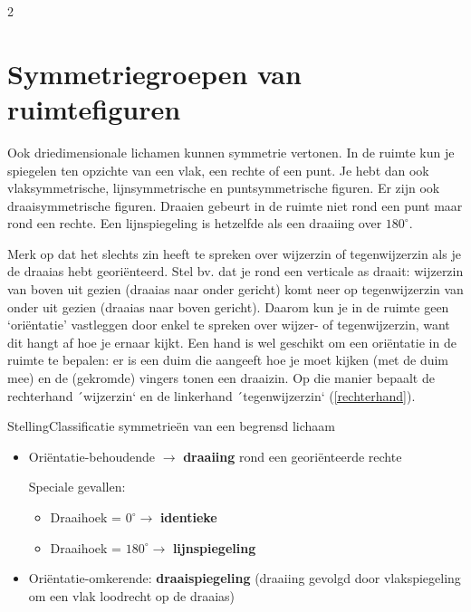 \begin{multicols}{2}
	
\section{Symmetriegroepen van ruimtefiguren}
	
	Ook driedimensionale lichamen kunnen symmetrie vertonen. In de ruimte kun je spiegelen ten opzichte van een vlak, een rechte of een punt. Je hebt dan ook vlaksymmetrische, lijnsymmetrische en puntsymmetrische figuren. Er zijn ook draaisymmetrische figuren. Draaien gebeurt in de ruimte niet rond een punt maar rond een rechte. Een lijnspiegeling is hetzelfde als een draaiing over $180^\circ$. 
 
		Merk op dat het slechts zin heeft te spreken over wijzerzin of tegenwijzerzin als je de draaias hebt georiënteerd. Stel bv. dat je rond een verticale as draait: wijzerzin van boven uit gezien (draaias naar onder gericht) komt neer op tegenwijzerzin van onder uit gezien (draaias naar boven gericht). Daarom kun je in de ruimte geen `oriëntatie' vastleggen door enkel te spreken over wijzer- of tegenwijzerzin, want dit hangt af hoe je ernaar kijkt. Een hand is wel geschikt om een oriëntatie in de ruimte te bepalen: er is een duim die aangeeft hoe je moet kijken (met de duim mee) en de (gekromde) vingers tonen een draaizin. Op die manier bepaalt de rechterhand ´wijzerzin` en de linkerhand ´tegenwijzerzin` (\autoref{rechterhand}).
	
	\begin{kader}{Stelling}{Classificatie symmetrieën van een begrensd lichaam}
	\begin{itemize}
	    \item Oriëntatie-behoudende $\rightarrow$ \textbf{draaiing} rond een georiënteerde rechte
	    
	    Speciale gevallen:
	    \begin{itemize}
	       \item Draaihoek = $0^\circ \rightarrow$ \textbf{identieke}
	       \item Draaihoek = $180^\circ \rightarrow$ \textbf{lijnspiegeling}
	    \end{itemize}
	  
	    \item Oriëntatie-omkerende: \textbf{draaispiegeling} (draaiing gevolgd door vlakspiegeling om een vlak loodrecht op de draaias)
	    

\end{itemize}
\end{kader}
\end{multicols}

